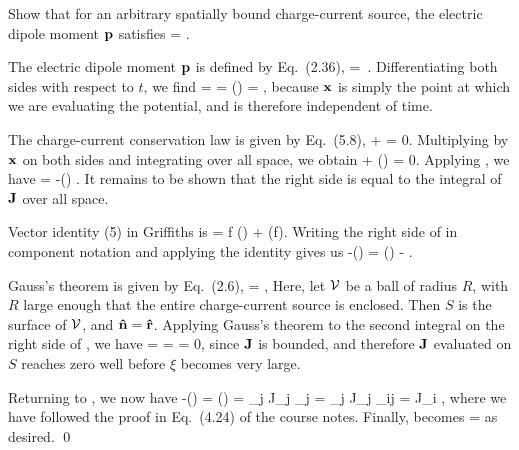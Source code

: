 \begin{statement}{}
	Show that for an arbitrary spatially bound charge-current source, the electric dipole moment $\vb{p}$ satisfies
	\beq
		 = \int \vJ \dcx.
	\eeq
\end{statement}

\begin{solution}
	The electric dipole moment $\vb{p}$ is defined by Eq.~(2.36),
	\beqn \label{dipole}
		\vp = \int \vx \,\rhox \dcx.
	\eeqn
	Differentiating both sides with respect to $t$, we find
	\beqn \label{pder}
		 =  \int \vx \rho \dcx = \int {} (\vx \rho) \dcx
		= \int \vx {} \dcx,
	\eeqn
	because $\vb{x}$ is simply the point at which we are evaluating the potential, and is therefore independent of time.
	
	The charge-current conservation law is given by Eq.~(5.8),
	\beqn \label{continuity}
		 + \div{\vJ} = 0.
	\eeqn
	Multiplying by $\vb{x}$ on both sides and integrating over all space, we obtain
	\beq
		\int \vx {} \dcx + \int \vx (\div{\vJ}) \dcx = 0.
	\eeq
	Applying , we have
	\beqn \label{thing1}
		 = -\int \vx (\div{\vJ}) \dcx.
	\eeqn
	It remains to be shown that the right side is equal to the integral of $\vb{J}$ over all space.
	
	Vector identity (5) in Griffiths is
	\beq
		 = f (\div{\vaa}) + \vaa \vdot (\grad f).
	\eeq
	Writing the right side of  in component notation and applying the identity gives us
	\beqn \label{thing2}
		-\int \xi (\div{\vJ}) \dcx = \int \vJ \vdot (\grad \xi) \dcx - \int \div{(\xi \vJ)} \dcx.
	\eeqn
	
	Gauss's theorem is given by Eq.~(2.6),
	\beq
		\intcV \div{\vv} \dcx = \intS \vv \vdot \nh \dS,
	\eeq
	Here, let $\mathcal{V}$ be a ball of radius $R$, with $R$ large enough that the entire charge-current source is enclosed.  Then $S$ is the surface of $\mathcal{V}$, and $\vb{\hat{n}} = \vb{\hat{r}}$.  Applying Gauss's theorem to the second integral on the right side of , we have
	\beq
		\int \div{(\xi \vJ)} \dcx = \limRi \intcV \div{(\xi \vJ)} \dcx
		= \limRi \intS \xi \vJ \vdot \rh \dS
		= 0,
	\eeq
	since $\vb{J}$ is bounded, and therefore $\vb{J}$ evaluated on $S$ reaches zero well before $\xi$ becomes very large.
	
	Returning to , we now have
	\beq
		-\int \xi (\div{\vJ}) \dcx = \int \vJ \vdot (\grad \xi) \dcx
		= \sum_j \int J_j \partial_j \xi \dcx
		= \sum_j \int J_j \del_{ij} \dcx
		= \int J_i \dcx,
	\eeq
	where we have followed the proof in Eq.~(4.24) of the course notes.  Finally,  becomes
	\beqn
		 = \int \vJ \dcx
	\eeqn
	as desired. \qed
\end{solution}